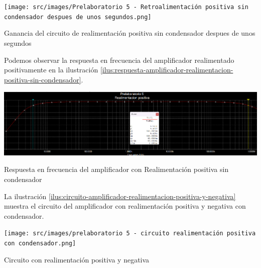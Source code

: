 \documentclass{article}
\begin{document}
\begin{ilustracion}[ht]
    \centering
    \texttt{[image: src/images/Prelaboratorio 5 - Retroalimentación positiva sin condensador despues de unos segundos.png]}
    \caption{Ganancia del circuito de realimentación positiva sin condensador despues de unos segundos}
    \label{ilus:ganancia-circuito-realimentacion-positiva-sin-condensador-despues-de-unos-segundos}
\end{ilustracion}

Podemos observar la respuesta en frecuencia del amplificador realimentado positivamente en la ilustración \ref{ilus:respuesta-amplificador-realimentacion-positiva-sin-condensador}.

\begin{ilustracion}[ht]
    \centering
    \includegraphics[width=\textwidth]{src/images/Prelaboratorio 5 - realimentacion positiva sin condensador - respuesta en frecuencia.png}
    \caption{Respuesta en frecuencia del amplificador con Realimentación positiva sin condensador} 
    \label{ilus:respuesta-amplificador-realimentacion-positiva-sin-condensador}
\end{ilustracion}


La ilustración \ref{ilus:circuito-amplificador-realimentacion-positiva-y-negativa} muestra el circuito del amplificador con realimentación positiva y negativa con condensador.

\begin{ilustracion}[ht]
    \centering
    \texttt{[image: src/images/prelaboratorio 5 - circuito realimentación positiva con condensador.png]}
    \caption{Circuito con realimentación positiva y negativa} 
    \label{ilus:circuito-amplificador-realimentacion-positiva-y-negativa}
\end{ilustracion}
\end{document}
